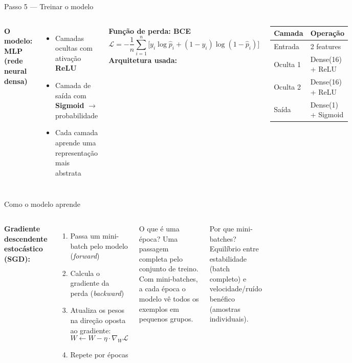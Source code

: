 \documentclass[aspectratio=169]{beamer}
\begin{document}
\begin{frame}{Passo 5 — Treinar o modelo}
\begin{columns}
\textbf{O modelo: MLP (rede neural densa)}
\begin{itemize}
  \item Camadas ocultas com ativação \textbf{ReLU}
  \item Camada de saída com \textbf{Sigmoid} $\to$ probabilidade
  \item Cada camada aprende uma representação mais abstrata
\end{itemize}
\vspace{6pt}
\textbf{Função de perda: BCE}
\[
  \mathcal{L} = -\frac{1}{n}\sum_{i=1}^{n}
  \bigl[ y_i \log\hat{p}_i + (1-y_i)\log(1-\hat{p}_i) \bigr]
\]
\textbf{Arquitetura usada:}\\[6pt]
\begin{center}
\begin{tabular}{ll}
  \toprule
  Camada & Operação \\
  \midrule
  Entrada  & 2 features \\
  Oculta 1 & Dense(16) + ReLU \\
  Oculta 2 & Dense(16) + ReLU \\
  Saída    & Dense(1)  + Sigmoid \\
  \bottomrule
\end{tabular}
\end{center}
\end{columns}
\end{frame}

\begin{frame}{Como o modelo aprende}
\begin{columns}
\textbf{Gradiente descendente estocástico (SGD):}
\begin{enumerate}
  \item Passa um mini-batch pelo modelo (\textit{forward})
  \item Calcula o gradiente da perda (\textit{backward})
  \item Atualiza os pesos na direção oposta ao gradiente:
  \[
    W \leftarrow W - \eta \cdot \nabla_W \mathcal{L}
  \]
  \item Repete por épocas
\end{enumerate}
\begin{block}{O que é uma época?}
  Uma passagem completa pelo conjunto de treino.
  Com mini-batches, a cada época o modelo vê todos os exemplos em pequenos grupos.
\end{block}
\vspace{6pt}
\begin{block}{Por que mini-batches?}
  Equilíbrio entre estabilidade (batch completo)
  e velocidade/ruído benéfico (amostras individuais).
\end{block}
\end{columns}
\end{frame}
\end{document}
